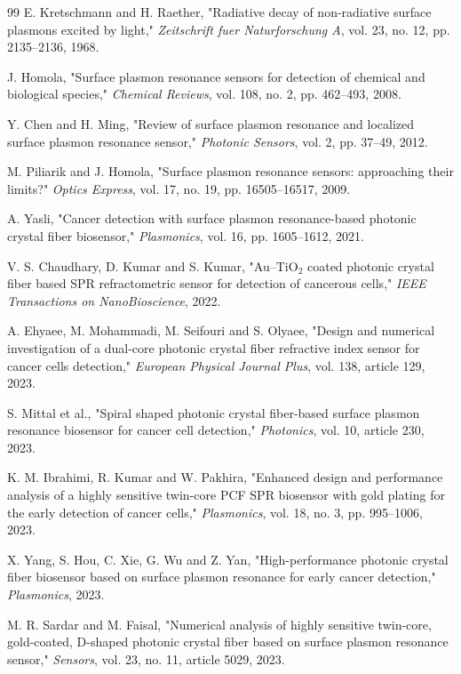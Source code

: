 \documentclass[5p,times,twocolumn]{elsarticle}
\begin{document}
\begin{thebibliography}{99}
 E. Kretschmann and H. Raether, "Radiative decay of non-radiative surface plasmons excited by light," \textit{Zeitschrift fuer Naturforschung A}, vol. 23, no. 12, pp. 2135--2136, 1968.

 J. Homola, "Surface plasmon resonance sensors for detection of chemical and biological species," \textit{Chemical Reviews}, vol. 108, no. 2, pp. 462--493, 2008.

 Y. Chen and H. Ming, "Review of surface plasmon resonance and localized surface plasmon resonance sensor," \textit{Photonic Sensors}, vol. 2, pp. 37--49, 2012.

 M. Piliarik and J. Homola, "Surface plasmon resonance sensors: approaching their limits?" \textit{Optics Express}, vol. 17, no. 19, pp. 16505--16517, 2009.

 A. Yasli, "Cancer detection with surface plasmon resonance-based photonic crystal fiber biosensor," \textit{Plasmonics}, vol. 16, pp. 1605--1612, 2021.

 V. S. Chaudhary, D. Kumar and S. Kumar, "Au--TiO$_2$ coated photonic crystal fiber based SPR refractometric sensor for detection of cancerous cells," \textit{IEEE Transactions on NanoBioscience}, 2022.

 A. Ehyaee, M. Mohammadi, M. Seifouri and S. Olyaee, "Design and numerical investigation of a dual-core photonic crystal fiber refractive index sensor for cancer cells detection," \textit{European Physical Journal Plus}, vol. 138, article 129, 2023.

 S. Mittal et al., "Spiral shaped photonic crystal fiber-based surface plasmon resonance biosensor for cancer cell detection," \textit{Photonics}, vol. 10, article 230, 2023.

 K. M. Ibrahimi, R. Kumar and W. Pakhira, "Enhanced design and performance analysis of a highly sensitive twin-core PCF SPR biosensor with gold plating for the early detection of cancer cells," \textit{Plasmonics}, vol. 18, no. 3, pp. 995--1006, 2023.

 X. Yang, S. Hou, C. Xie, G. Wu and Z. Yan, "High-performance photonic crystal fiber biosensor based on surface plasmon resonance for early cancer detection," \textit{Plasmonics}, 2023.

 M. R. Sardar and M. Faisal, "Numerical analysis of highly sensitive twin-core, gold-coated, D-shaped photonic crystal fiber based on surface plasmon resonance sensor," \textit{Sensors}, vol. 23, no. 11, article 5029, 2023.


\end{thebibliography}
\end{document}

